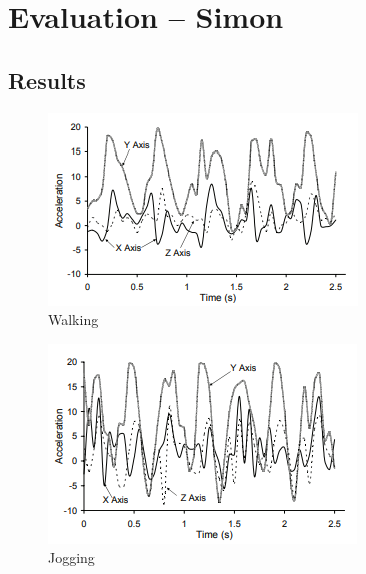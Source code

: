 \documentclass[conference]{IEEEtran}
\begin{document}
\section{Evaluation -- Simon}

\subsection{Results}
\begin{figure}[!htb]
  \includegraphics[width=\linewidth]{walking.png}
  \caption{Walking}
  \label{fig:walking}
\end{figure}
\begin{figure}[!htb]
  \includegraphics[width=\linewidth]{jogging.png}
  \caption{Jogging}
  \label{fig:jogging}
\end{figure}
\end{document}
